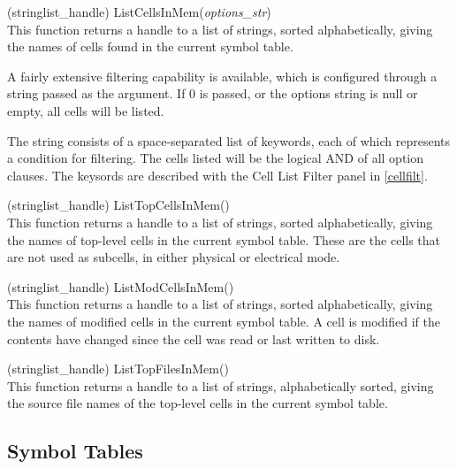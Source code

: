 \begin{description}
\item{(stringlist\_handle) \vt ListCellsInMem({\it options\_str\/})}\\
This function returns a handle to a list of strings, sorted
alphabetically, giving the names of cells found in the current symbol
table.
  
A fairly extensive filtering capability is available, which is
configured through a string passed as the argument.  If 0 is passed,
or the options string is null or empty, all cells will be listed.

The string consists of a space-separated list of keywords, each of
which represents a condition for filtering.  The cells listed will be
the logical AND of all option clauses.  The keysords are described
with the {\cb Cell List Filter} panel in \ref{cellfilt}.

\item{(stringlist\_handle) \vt ListTopCellsInMem()}\\
This function returns a handle to a list of strings, sorted
alphabetically, giving the names of top-level cells in the current
symbol table.  These are the cells that are not used as subcells, in
either physical or electrical mode.

\item{(stringlist\_handle) \vt ListModCellsInMem()}\\
This function returns a handle to a list of strings, sorted
alphabetically, giving the names of modified cells in the current
symbol table.  A cell is modified if the contents have changed since
the cell was read or last written to disk.

\item{(stringlist\_handle) \vt ListTopFilesInMem()}\\
This function returns a handle to a list of strings, alphabetically
sorted, giving the source file names of the top-level cells in the
current symbol table.

\end{description}


\subsection{Symbol Tables}

